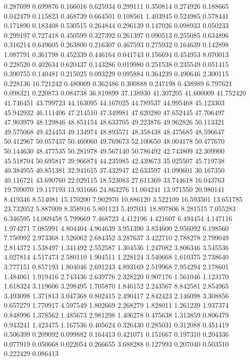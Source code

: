 0.287699
0.699876
0.166016
0.625934
0.299111
0.350814
0.274926
0.188665
0.042479
0.115823
0.468739
0.664501
0.108561
1.403945
0.524985
0.578441
0.171890
0.183408
0.530515
0.264844
0.296139
0.147026
0.098933
0.050233
0.299197
0.727418
0.450599
0.327392
0.261397
0.090513
0.255085
0.634896
0.316214
0.649605
0.263800
0.216307
0.467593
0.275932
0.164639
0.142898
1.087791
0.361798
0.452339
0.446164
0.041743
0.156694
0.454953
8.070013
0.228520
0.402634
0.620437
0.143286
0.019980
0.251538
0.235549
0.051415
0.390755
0.140481
0.215025
0.093229
0.095884
0.364239
0.490646
2.300115
0.228136
16.721242
0.480009
0.362486
0.300888
0.247198
0.438989
6.797621
0.098321
0.220873
0.084738
36.819899
37.138930
41.307205
41.600009
41.752420
41.746451
43.799723
44.163095
44.167025
44.789537
44.995468
45.123303
45.942932
46.111406
47.214510
47.349981
47.620280
47.652445
47.706497
47.903979
48.129846
48.851154
48.633705
49.223876
49.962826
50.113321
49.575068
49.424453
49.134974
48.893571
48.358438
48.475685
48.596647
50.412967
50.057437
50.460060
49.769673
52.100650
48.004178
50.477670
50.144630
48.477535
50.281978
49.567140
50.786492
42.743809
42.309900
45.518704
50.695817
39.966874
44.235985
42.439673
35.025507
45.719738
40.384955
40.851381
32.941615
37.432947
42.633597
41.090601
30.167350
40.116721
43.690760
22.029115
18.523083
27.611369
33.744618
16.043763
19.709070
19.117193
13.931666
24.863276
11.004241
13.971550
20.980141
8.419346
8.514081
15.170200
7.902970
10.886120
3.522109
16.593501
13.651785
23.732052
5.887009
8.358916
5.801123
5.497031
18.897806
8.281515
7.055283
6.346595
14.069458
5.799669
7.468723
4.412196
4.421607
6.494454
4.147116
1.974271
7.085991
4.804404
4.964639
3.951390
3.834600
2.956092
6.198560
7.750992
2.973368
1.526062
2.684352
3.287637
3.422710
2.788278
2.799049
2.814372
1.538497
1.341492
2.552587
1.304536
1.247082
3.806346
3.545536
4.027814
4.517473
2.580110
1.904511
1.228124
3.540668
1.610375
2.738640
3.777151
0.857193
1.804046
2.691243
4.893169
2.519968
7.954294
2.178601
1.484061
1.919416
2.743436
2.639776
2.328220
0.907176
1.561046
1.123170
1.618324
3.119606
3.298495
1.705870
1.846152
2.243567
8.842581
2.854965
3.493098
1.371813
3.047368
0.802415
2.490417
2.842423
2.146098
3.308856
0.657279
1.770917
4.597549
1.802669
2.268279
1.828011
1.261239
1.937374
0.848996
1.378562
1.485673
2.981298
1.406278
0.475638
1.313859
0.806479
0.943241
1.423475
1.167536
0.405624
0.326430
0.285031
0.312088
0.451419
0.506399
0.209092
0.099882
0.164413
0.421071
0.151667
0.197310
0.204336
0.077919
0.050668
0.022054
0.266655
3.688288
0.127993
0.207040
0.503510
0.222429
0.086413
